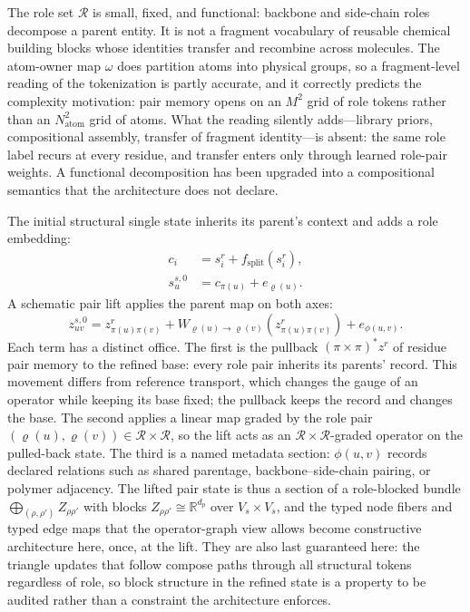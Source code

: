 \begin{remark}
\label{rem:book-opendde-role-not-fragment}
The role set $\mathcal R$ is small, fixed, and functional: backbone and side-chain roles
decompose a parent entity.  It is not a fragment vocabulary of reusable chemical building blocks
whose identities transfer and recombine across molecules.  The atom-owner map $\omega$ does
partition atoms into physical groups, so a fragment-level reading of the tokenization is partly
accurate, and it correctly predicts the complexity motivation: pair memory opens on an $M^2$ grid
of role tokens rather than an $N_{\mathrm{atom}}^2$ grid of atoms.  What the reading silently
adds---library priors, compositional assembly, transfer of fragment identity---is absent: the
same role label recurs at every residue, and transfer enters only through learned role-pair
weights.  A functional decomposition has been upgraded into a compositional semantics that the
architecture does not declare.
\end{remark}

The initial structural single state inherits its parent's context and adds a role embedding:
\begin{align}
c_i&=s_i^r+f_{\mathrm{split}}(s_i^r),\\
s_u^{s,0}&=c_{\pi(u)}+e_{\varrho(u)}.
\label{eq:book-opendde-single-lift}
\end{align}
A schematic pair lift applies the parent map on both axes:
\begin{equation}
z_{uv}^{s,0}
=z_{\pi(u)\pi(v)}^r
+W_{\varrho(u)\to\varrho(v)}\!\left(z_{\pi(u)\pi(v)}^r\right)
+e_{\phi(u,v)}.
\label{eq:book-opendde-pair-lift}
\end{equation}
Each term has a distinct office.  The first is the pullback $(\pi\times\pi)^*z^r$ of residue pair
memory to the refined base: every role pair inherits its parents' record.  This movement differs
from reference transport, which changes the gauge of an operator while keeping its base fixed;
the pullback keeps the record and changes the base.  The second applies a
linear map graded by the role pair $(\varrho(u),\varrho(v))\in\mathcal R\times\mathcal R$, so the
lift acts as an $\mathcal R\times\mathcal R$-graded operator on the pulled-back state.  The third
is a named metadata section: $\phi(u,v)$ records declared relations such as shared parentage,
backbone--side-chain pairing, or polymer adjacency.  The lifted pair state is thus a section of a
role-blocked bundle $\bigoplus_{(\rho,\rho')}Z_{\rho\rho'}$ with blocks
$Z_{\rho\rho'}\cong\mathbb R^{d_p}$ over $V_s\times V_s$, and the typed node fibers and typed
edge maps that the operator-graph view allows become constructive architecture here, once, at
the lift.  They are also last guaranteed here: the triangle updates that follow compose paths
through all structural tokens regardless of role, so block structure in the refined state is a
property to be audited rather than a constraint the architecture enforces.

